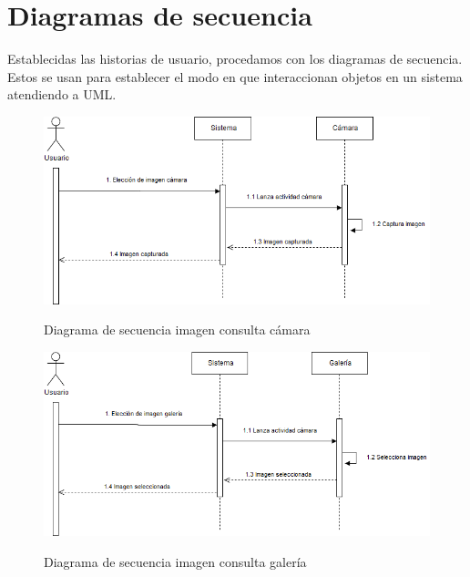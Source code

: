 \section{Diagramas de secuencia}

Establecidas las historias de usuario, procedamos con los diagramas de secuencia. Estos se usan para establecer el modo en que interaccionan objetos en un sistema atendiendo a UML.

\begin{figure}[H] %
\centering
\includegraphics[scale=0.6]{imagenes/imagenCamara.png}  %
\label{imagenCamara.png}
\caption{Diagrama de secuencia imagen consulta cámara}
\end{figure}

\begin{figure}[H] %
\centering
\includegraphics[scale=0.6]{imagenes/imagenGaleria.png}  %
\label{imagenGaleria.png}
\caption{Diagrama de secuencia imagen consulta galería}
\end{figure}

